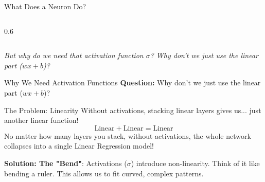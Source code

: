 \begin{frame}{What Does a Neuron Do?}
\begin{columns}[c]
\begin{column}{0.6\textwidth}
        \end{column}
    \end{columns}
    
    \pause
    \vspace{0.8em}
    \centering
    \textit{But why do we need that activation function $\sigma$? Why don't we just use the linear part ($wx+b$)?}
\end{frame}

\begin{frame}{Why We Need Activation Functions}
    \textbf{Question:} Why don't we just use the linear part ($wx+b$)?
    
    \vspace{1em}
    \begin{alertblock}{The Problem: Linearity}
        Without activations, stacking linear layers gives us... just another linear function!
        $$ \text{Linear} + \text{Linear} = \text{Linear} $$
        No matter how many layers you stack, without activations, the whole network collapses into a single Linear Regression model!
    \end{alertblock}
    
    \pause
    \vspace{1em}
    \begin{tcolorbox}[colback=green!5, colframe=green!50]
        \textbf{Solution: The "Bend"}:
        Activations ($\sigma$) introduce non-linearity. 
        Think of it like bending a ruler. This allows us to fit curved, complex patterns.
    \end{tcolorbox}
\end{frame}

    
    
